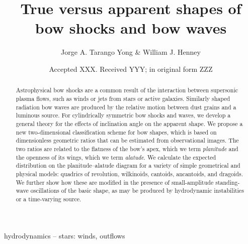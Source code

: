 \documentclass[useAMS, usenatbib, a4paper]{mnras}
\title[Bow shock shapes]{True versus apparent shapes of bow shocks and bow waves}
\author[Tarango Yong \& Henney]{
  Jorge A. Tarango Yong \& William J. Henney\\
  \AddressCRyA
}
\date{Accepted XXX. Received YYY; in original form ZZZ}
\begin{document}
\label{firstpage}
\pagerange{\pageref{firstpage}--\pageref{lastpage}}
\maketitle
\begin{abstract}
  Astrophysical bow shocks are a common result of the interaction
  between supersonic plasma flows, such as winds or jets from stars or
  active galaxies.  Similarly shaped radiation bow waves are produced
  by the relative motion between dust grains and a luminous source.
  For cylindrically symmetric bow shocks and waves, we develop a
  general theory for the effects of inclination angle on the apparent
  shape. We propose a new two-dimensional classification scheme for
  bow shapes, which is based on dimensionless geometric ratios that
  can be estimated from observational images.  The two ratios are
  related to the flatness of the bow's apex, which we term
  \textit{planitude} and the openness of its wings, which we term
  \textit{alatude}.  We calculate the expected distribution on the
  planitude--alatude diagram for a variety of simple geometrical and
  physical models: quadrics of revolution, wilkinoids, cantoids,
  ancantoids, and dragoids.  We further show how these are modified in
  the presence of small-amplitude standing-wave oscillations of the
  basic shape, as may be produced by hydrodynamic instabilities or a
  time-varying source.
\end{abstract}

\begin{keywords}
  hydrodynamics -- stars: winds, outflows
\end{keywords}


% 




\clearpage


\clearpage


\appendix



%
%
%

\bsp	%
\label{lastpage}
\end{document}
